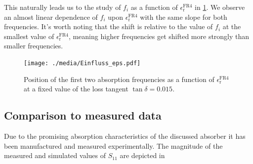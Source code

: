 This naturally leads us to the study of $f_i$ as a function of $\epsilon_\mathrm{r}^\text{FR4}$ in \cref{fig:fi_epsr}. We observe an almost linear dependence of $f_i$ upon $\epsilon_\mathrm{r}^\text{FR4}$ with the same slope for both frequencies. It's worth noting that the shift is relative to the value of $f_i$ at the smallest value of $\epsilon_\mathrm{r}^\text{FR4}$, meaning higher frequencies get shifted more strongly than smaller frequencies. 

\begin{figure}
\centering
\texttt{[image: ./media/Einfluss\_eps.pdf]}
\caption{Position of the first two absorption frequencies as a function of $\epsilon_\mathrm{r}^\text{FR4}$ at a fixed value of the loss tangent $\tan\delta=0.015$.}
\label{fig:fi_epsr}
\end{figure}


\subsection{Comparison to measured data}
Due to the promising absorption characteristics of the discussed absorber it has been manufactured and measured experimentally. The magnitude of the measured and simulated values of $S_{11}$ are depicted in 